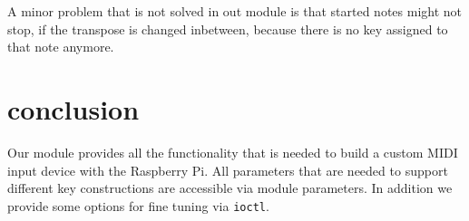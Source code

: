 \documentclass[paper=a4,fontsize=11pt,twocolumn,pagesize,bibtotoc]{scrartcl}
\begin{document}
A minor problem that is not solved in out module is that started notes might not stop, if the transpose is changed inbetween, because there is no key assigned to that note anymore.

\section{conclusion}
Our module provides all the functionality that is needed to build a custom MIDI input device with the Raspberry Pi. All parameters that are needed to support different key constructions are accessible via module parameters. In addition we provide some options for fine tuning via \texttt{ioctl}.
	
	
	
\end{document}
